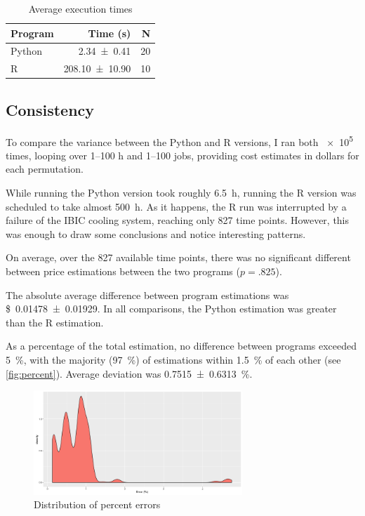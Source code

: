 \documentclass[11pt]{article}
\begin{document}
	\begin{table}[h]
		\centering
		\begin{tabular}{lrr}
			\toprule
			Program & Time (s) & N \\
			\midrule
			Python 	& \num{2.34\pm0.41}	& 20 \\
			R		& \num{208.10\pm10.90}	& 10 \\
			\bottomrule
		\end{tabular}
		\caption{Average execution times}
		\label{table:times}
	\end{table}
	
	\begin{multicols}{2}
		
		\section{Consistency}
		
		To compare the variance between the Python and R versions, I ran both \num{e5} times, looping over \numrange{1}{100} \si{\hour} and \numrange{1}{100} jobs, providing cost estimates in dollars for each permutation.
		
		While running the Python version took roughly \SI{6.5}{\hour}, running the R version was scheduled to take almost \SI{500}{\hour}. As it happens, the R run was interrupted by a failure of the IBIC cooling system, reaching only \num{827} time points.		
		However, this was enough to draw some conclusions and notice interesting patterns.
		
		On average, over the \num{827} available time points, there was no significant different between price estimations between the two programs ($p=.825$).
		
		The absolute average difference between program estimations was \SI{0.01478\pm0.01929}[\$]{}. In all comparisons, the Python estimation was greater than the R estimation.
		
		As a percentage of the total estimation, no difference between programs exceeded \SI{5}{\percent}, with the majority (\SI{97}{\percent}) of estimations within \SI{1.5}{\percent} of each other (see \autoref{fig:percent}). Average deviation was \SI{0.7515\pm.6313}{\percent}. 
		
	\end{multicols}
	
	\begin{figure}[h]
		\centering
		\includegraphics[width=0.7\textwidth]{error_percent}
		\caption{Distribution of percent errors}
		\label{fig:percent}
	\end{figure}
	
\end{document}
